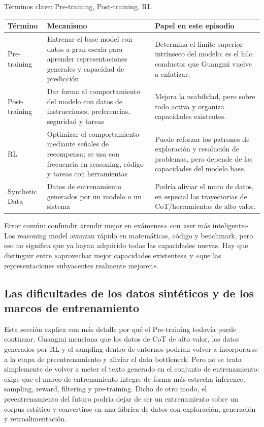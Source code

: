 \begin{knowledgebox}{Términos clave: Pre-training, Post-training, RL}
\noindent\begin{tabularx}{\textwidth}{p{}p{}X}
\toprule
Término & Mecanismo & Papel en este episodio \\
\midrule
Pre-training & Entrenar el base model con datos a gran escala para aprender representaciones generales y capacidad de predicción & Determina el límite superior intrínseco del modelo; es el hilo conductor que Guangmi vuelve a enfatizar. \\
Post-training & Dar forma al comportamiento del modelo con datos de instrucciones, preferencias, seguridad y tareas & Mejora la usabilidad, pero sobre todo activa y organiza capacidades existentes. \\
RL & Optimizar el comportamiento mediante señales de recompensa; se usa con frecuencia en reasoning, código y tareas con herramientas & Puede reforzar los patrones de exploración y resolución de problemas, pero depende de las capacidades del modelo base. \\
Synthetic Data & Datos de entrenamiento generados por un modelo o un sistema & Podría aliviar el muro de datos, en especial las trayectorias de CoT/herramientas de alto valor. \\
\bottomrule
\end{tabularx}
\end{knowledgebox}

\begin{warningbox}{Error común: confundir «rendir mejor en exámenes» con «ser más inteligente»}
Los reasoning model avanzan rápido en matemáticas, código y benchmark, pero eso no significa que ya hayan adquirido todas las capacidades nuevas. Hay que distinguir entre «aprovechar mejor capacidades existentes» y «que las representaciones subyacentes realmente mejoren».
\end{warningbox}

\subsection{Las dificultades de los datos sintéticos y de los marcos de entrenamiento}

Esta sección explica con más detalle por qué el Pre-training todavía puede continuar. Guangmi menciona que los datos de CoT de alto valor, los datos generados por RL y el sampling dentro de entornos podrían volver a incorporarse a la etapa de preentrenamiento y aliviar el data bottleneck. Pero no se trata simplemente de volver a meter el texto generado en el conjunto de entrenamiento: exige que el marco de entrenamiento integre de forma más estrecha inference, sampling, reward, filtering y pre-training. Dicho de otro modo, el preentrenamiento del futuro podría dejar de ser un entrenamiento sobre un corpus estático y convertirse en una fábrica de datos con exploración, generación y retroalimentación.

